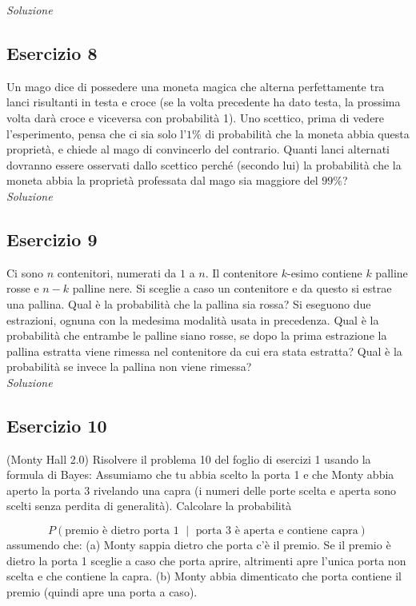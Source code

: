 \textit{Soluzione} \quad
\subsection{Esercizio 8} 
Un mago dice di possedere una moneta magica che alterna perfettamente tra lanci risultanti in testa e croce (se la volta precedente ha dato testa, la prossima volta darà croce e viceversa con probabilità 1). Uno scettico, prima di vedere l’esperimento, pensa che ci sia solo l’$1\%$ di probabilità che la moneta abbia questa proprietà, e chiede al mago di convincerlo del contrario. Quanti lanci alternati dovranno essere osservati dallo scettico perché (secondo lui) la probabilità che la moneta abbia la proprietà professata dal mago sia maggiore del $99\%$?
\\

\textit{Soluzione} \quad

\subsection{Esercizio 9} 
Ci sono $n$ contenitori, numerati da $1$ a $n$. Il contenitore $k$-esimo contiene $k$ palline rosse e $n - k$ palline nere. Si sceglie a caso un contenitore e da questo si estrae una pallina. Qual è la probabilità che la pallina sia rossa? Si eseguono due estrazioni, ognuna con la medesima modalità usata in precedenza. Qual è la probabilità che entrambe le palline siano rosse, se dopo la prima estrazione la pallina estratta viene rimessa nel contenitore da cui era stata estratta? Qual è la probabilità se invece la pallina non viene rimessa?
\\

\textit{Soluzione} \quad


\subsection{Esercizio 10} 
(Monty Hall 2.0) Risolvere il problema 10 del foglio di esercizi 1 usando la formula di Bayes: Assumiamo che tu abbia scelto la porta 1 e che Monty abbia aperto la porta 3 rivelando una capra (i numeri delle porte scelta e aperta sono scelti senza perdita di generalità). Calcolare la probabilità


\[P (\text{premio è dietro porta 1 $\mid$ porta 3 è aperta e contiene capra})\]
assumendo che: 
 (a) Monty sappia dietro che porta c’è il premio. Se il premio è dietro la porta 1 sceglie a caso che porta aprire, altrimenti apre l’unica porta non scelta e che contiene la capra. 
(b) Monty abbia dimenticato che porta contiene il premio (quindi apre una porta a caso).
\\

